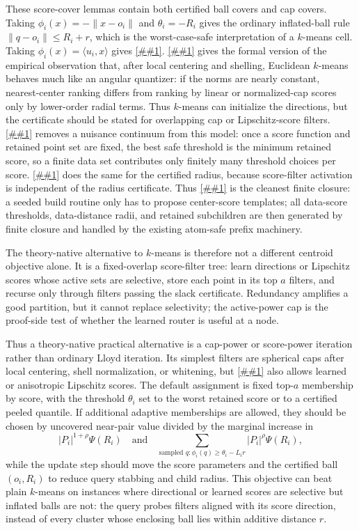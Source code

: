 \documentclass[10pt]{article}
\newcommand{\cref}[1]{\ref{##1}}
\newcommand{\Cref}[1]{\ref{##1}}
\theoremstyle{definition}
\begin{document}
These score-cover lemmas contain both certified ball covers and cap covers.  Taking
$\phi_i(x)=-\|x-o_i\|$ and $\theta_i=-R_i$ gives the ordinary inflated-ball
rule $\|q-o_i\|\le R_i+r$, which is the worst-case-safe interpretation of a
$k$-means cell.  Taking $\phi_i(x)=\langle u_i,x\rangle$ gives
\cref{lem:cap-slack-cover}.  \Cref{lem:shell-normalized-cap-cover} gives the
formal version of the empirical observation that, after local centering and
shelling, Euclidean $k$-means behaves much like an angular quantizer: if the
norms are nearly constant, nearest-center ranking differs from ranking by
linear or normalized-cap scores only by lower-order radial terms.  Thus
$k$-means can initialize the directions, but the certificate should be stated
for overlapping cap or Lipschitz-score filters.
\Cref{lem:threshold-tightening} removes a nuisance continuum from this model:
once a score function and retained point set are fixed, the best safe threshold
is the minimum retained score, so a finite data set contributes only finitely
many threshold choices per score.  \Cref{lem:radius-tightening} does the same
for the certified radius, because score-filter activation is independent of the
radius certificate.  Thus \cref{lem:center-score-closure} is the cleanest
finite closure: a seeded build routine only has to propose center-score
templates; all data-score thresholds, data-distance radii, and retained
subchildren are then generated by finite closure and handled by the existing
atom-safe prefix machinery.

The theory-native alternative to $k$-means is therefore not a different
centroid objective alone.  It is a fixed-overlap score-filter tree: learn
directions or Lipschitz scores whose active sets are selective, store each
point in its top $a$ filters, and recurse only through filters passing the
slack certificate.  Redundancy amplifies a good partition, but it cannot
replace selectivity; the active-power cap is the proof-side test of whether the
learned router is useful at a node.

Thus a theory-native practical alternative is a cap-power or score-power
iteration rather than ordinary Lloyd iteration.  Its simplest filters are
spherical caps after local centering, shell normalization, or whitening, but
\cref{lem:lipschitz-score-cover} also allows learned or anisotropic Lipschitz
scores.  The default assignment is fixed top-$a$ membership by score, with the
threshold $\theta_i$ set to the worst retained score or to a certified peeled
quantile.  If additional adaptive memberships are allowed, they should be
chosen by uncovered near-pair value divided by the marginal increase in
\[
   |P_i|^{1+\rho}\Psi(R_i)
   \quad\text{and}\quad
   \sum_{\text{sampled }q:
      \phi_i(q)\ge\theta_i-L_i r}
      |P_i|^\rho\Psi(R_i),
\]
while the update step should move the score parameters and the certified ball
$(o_i,R_i)$ to reduce query stabbing and child radius.  This objective can beat
plain $k$-means on instances where directional or learned scores are selective
but inflated balls are not: the query probes filters aligned with its score
direction, instead of every cluster whose enclosing ball lies within additive
distance $r$.
\end{document}
